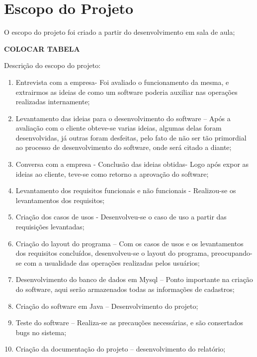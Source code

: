 \section{Escopo do Projeto}

O escopo do projeto foi criado a partir do desenvolvimento em sala de aula;	

\begin{center}
	\textbf{COLOCAR TABELA}
\end{center}


Descrição do escopo do projeto:

\begin {enumerate}

\item Entrevista com a empresa- Foi avaliado o funcionamento da mesma, e extrairmos as ideias de como um software poderia auxiliar nas operações realizadas internamente;

\item Levantamento das ideias para o desenvolvimento do software – Após a avaliação com o cliente obteve-se varias ideias, algumas delas foram desenvolvidas, já outras foram desfeitas, pelo fato de não ser tão primordial ao processo de desenvolvimento do software, onde será citado a diante;

\item Conversa com a empresa - Conclusão das ideias obtidas-  Logo após expor as ideias ao cliente, teve-se como retorno a aprovação do software;


\item Levantamento dos requisitos funcionais e não funcionais  - Realizou-se os levantamentos dos requisitos;

\item Criação dos casos de usos  - Desenvolveu-se o caso de uso a partir das requisições levantadas;

\item Criação do layout do programa – Com os casos de usos e os levantamentos dos requisitos  concluídos, desenvolveu-se o layout do programa, preocupando-se com a usualidade das operações realizadas pelos usuários;

\item Desenvolvimento do banco de dados em Mysql – Ponto importante na criação do software, aqui serão armazenados todas as informações de cadastros;

\item Criação do software em Java – Desenvolvimento do projeto;


\item Teste do software – Realiza-se as precauções necessárias, e são consertados bugs no sistema;

\item Criação da documentação do projeto – desenvolvimento do relatório;

\end{enumerate}